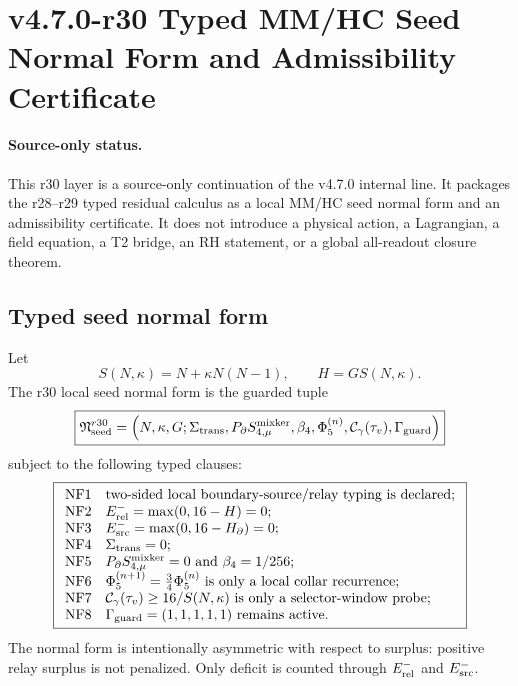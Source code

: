 \section{v4.7.0-r30 Typed MM/HC Seed Normal Form and Admissibility Certificate}
\label{sec:v470-r30-seed-normal-form-certificate}

\paragraph{Source-only status.}
This r30 layer is a source-only continuation of the v4.7.0 internal line.  It
packages the r28--r29 typed residual calculus as a local MM/HC seed normal form
and an admissibility certificate.  It does not introduce a physical action, a
Lagrangian, a field equation, a T2 bridge, an RH statement, or a global
all-readout closure theorem.

\subsection{Typed seed normal form}
\label{subsec:v470-r30-typed-seed-normal-form}

Let
\[
S(N,\kappa)=N+\kappa N(N-1),
\qquad
H=G S(N,\kappa).
\]
The r30 local seed normal form is the guarded tuple
\[
\boxed{
\mathfrak N_{\rm seed}^{r30}
=
\left(
N,\kappa,G;
\Sigma_{\rm trans},
P_{\partial}S_{4,\mu}^{\rm mixker},
\beta_4,
\Phi_5^{(n)},
\mathcal C_{\gamma}(\tau_v),
\Gamma_{\rm guard}
\right)
}
\]
subject to the following typed clauses:
\[
\boxed{
\begin{array}{ll}
{\rm NF1} & \text{two-sided local boundary-source/relay typing is declared;}\\
{\rm NF2} & E_{\rm rel}^{-}=\max(0,16-H)=0;\\
{\rm NF3} & E_{\rm src}^{-}=\max(0,16-H_{\partial})=0;\\
{\rm NF4} & \Sigma_{\rm trans}=0;\\
{\rm NF5} & P_{\partial}S_{4,\mu}^{\rm mixker}=0\ \text{and}\ \beta_4=1/256;\\
{\rm NF6} & \Phi_5^{(n+1)}={3\over4}\Phi_5^{(n)}\ \text{is only a local collar recurrence;}\\
{\rm NF7} & \mathcal C_{\gamma}(\tau_v)\geq16/S(N,\kappa)\ \text{is only a selector-window probe;}\\
{\rm NF8} & \Gamma_{\rm guard}=(1,1,1,1,1)\ \text{remains active.}
\end{array}
}
\]
The normal form is intentionally asymmetric with respect to surplus: positive
relay surplus is not penalized.  Only deficit is counted through
\(E_{\rm rel}^{-}\) and \(E_{\rm src}^{-}\).

